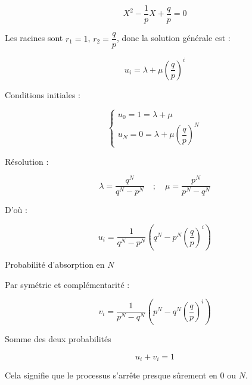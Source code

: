 \documentclass[10pt,a4paper]{article}
\begin{document}
\[
X^2 - \dfrac{1}{p} X + \dfrac{q}{p} = 0
\]

Les racines sont \( r_1 = 1 \), \( r_2 = \dfrac{q}{p} \), donc la solution générale est :

\[
u_i = \lambda + \mu \left( \dfrac{q}{p} \right)^i
\]

Conditions initiales :

\[
\begin{cases}
u_0 = 1 = \lambda + \mu \\
u_N = 0 = \lambda + \mu \left( \dfrac{q}{p} \right)^N
\end{cases}
\]

Résolution :

\[
\lambda = \dfrac{q^N}{q^N - p^N} \quad ; \quad \mu = \dfrac{p^N}{p^N - q^N}
\]

D'où :

\[
\boxed{u_i = \dfrac{1}{q^N - p^N} \left( q^N - p^N \left( \dfrac{q}{p} \right)^i \right)}
\]

\q Probabilité d'absorption en \( N \)

Par symétrie et complémentarité :

\[
\boxed{v_i = \dfrac{1}{p^N - q^N} \left( p^N - q^N \left( \dfrac{q}{p} \right)^i \right)}
\]

\q Somme des deux probabilités

\[
\boxed{u_i + v_i = 1}
\]

Cela signifie que le processus s'arrête presque sûrement en \( 0 \) ou \( N \).
\end{document}
